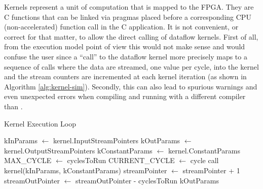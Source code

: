 \label{sec:kernels-streams}

Kernels represent a unit of computation that is mapped to the FPGA.
They are C functions that can be linked via pragmas placed before a
corresponding CPU (non-accelerated) function call in the C
application.  It is not convenient, or correct for that matter, to
allow the direct calling of dataflow kernels. First of all, from the
execution model point of view this would not make sense and would
confuse the user since a ``call'' to the dataflow kernel more
precisely maps to a sequence of calls where the data are streamed, one
value per cycle, into the kernel and the stream counters are
incremented at each kernel iteration (as shown in Algorithm
\ref{alg:kernel-sim}).  Secondly, this can also lead to spurious
warnings and even unexpected errors when compiling and running with a
different compiler than \fastc{}.

\begin{algorithm}
  \caption{Kernel Execution Loop}
  \label{alg:kernel-sim}
  \begin{algorithmic}
    \State kInParams $\gets$ kernel.InputStreamPointers
    \State kOutParams $\gets$ kernel.OutputStreamPointers
    \State kConstantParams $\gets$ kernel.ConstantParams
    \State MAX\_CYCLE $\gets$ cyclesToRun
    \State CURRENT\_CYCLE $\gets$ cycle
    \State call kernel(kInParams, kConstantParams)
    \State streamPointer $\gets$ streamPointer + 1
    \EndFor
    \EndFor
    \State streamOutPointer $\gets$ streamOutPointer - cyclesToRun
    \EndFor
    \State \Return kOutParams
    \EndFunction
  \end{algorithmic}
\end{algorithm}

